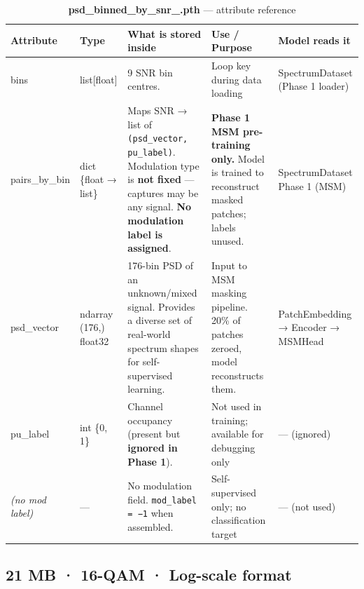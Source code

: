 \documentclass[11pt,a4paper]{article}
\begin{document}
\begin{table}[h!]
\centering
\caption{\textbf{psd\_binned\_by\_snr\_.pth} — attribute reference}
\renewcommand{\arraystretch}{1.55}
\begin{tabularx}{\textwidth}{>{\ttfamily\small}l l X l l}
\toprule
\textbf{Attribute} & \textbf{Type} & \textbf{What is stored inside} & \textbf{Use / Purpose} & \textbf{Model reads it} \\
\midrule

bins
  & list[float]
  & 9 SNR bin centres.
  & Loop key during data loading
  & SpectrumDataset (Phase 1 loader) \\[6pt]

pairs\_by\_bin
  & dict \{float → list\}
  & Maps SNR → list of \texttt{(psd\_vector, pu\_label)}.
    Modulation type is \textbf{not fixed} — captures may be any signal.
    \textbf{No modulation label is assigned}.
  & \textbf{Phase 1 MSM pre-training only.}
    Model is trained to reconstruct masked patches; labels unused.
  & SpectrumDataset Phase 1 (MSM) \\[6pt]

\quad psd\_vector
  & ndarray (176,) float32
  & 176-bin PSD of an unknown/mixed signal.
    Provides a diverse set of real-world spectrum shapes for
    self-supervised learning.
  & Input to MSM masking pipeline.
    20\% of patches zeroed, model reconstructs them.
  & PatchEmbedding → Encoder → MSMHead \\[6pt]

\quad pu\_label
  & int \{0, 1\}
  & Channel occupancy (present but \textbf{ignored in Phase 1}).
  & Not used in training; available for debugging only
  & — (ignored) \\[6pt]

\textit{(no mod label)}
  & —
  & No modulation field. \texttt{mod\_label = −1} when assembled.
  & Self-supervised only; no classification target
  & — (not used) \\

\bottomrule
\end{tabularx}
\end{table}

\subsection*{
\hfill\small 21 MB · 16-QAM · Log-scale format}
\end{document}
